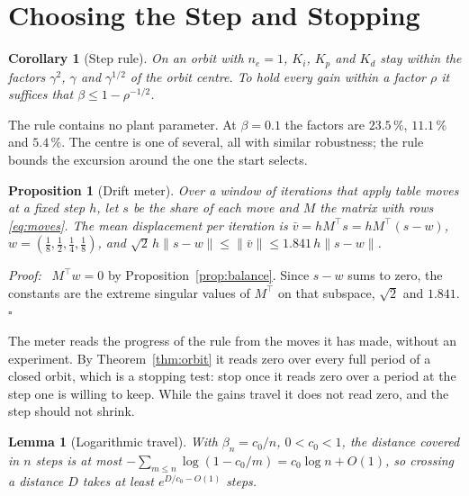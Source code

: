 \documentclass[letterpaper, 10 pt, conference]{ieeeconf}
\newtheorem{lemma}{Lemma}
\newtheorem{proposition}{Proposition}
\newtheorem{corollary}{Corollary}
\renewenvironment{proof}{\noindent\textit{Proof:}\ }{\hfill$\square$\par\smallskip}
\begin{document}
\section{Choosing the Step and Stopping}
\label{sec:step}

\begin{corollary}[Step rule]\label{cor:design}
On an orbit with $n_e = 1$, $K_i$, $K_p$ and $K_d$ stay within the factors
$\gamma^2$, $\gamma$ and $\gamma^{1/2}$ of the orbit centre. To hold every gain
within a factor $\rho$ it suffices that $\beta \le 1 - \rho^{-1/2}$.
\end{corollary}

The rule contains no plant parameter. At $\beta = 0.1$ the factors are
$23.5\,\%$, $11.1\,\%$ and $5.4\,\%$. The centre is one of several, all with
similar robustness; the rule bounds the excursion around the one the start
selects.

\begin{proposition}[Drift meter]\label{prop:meter}
Over a window of iterations that apply table moves at a fixed step $h$, let
$s$ be the share of each move and $M$ the matrix with rows \eqref{eq:moves}.
The mean displacement per iteration is
$\bar v = h M^{\top} s = h M^{\top}(s - w)$,
$w = (\tfrac18, \tfrac12, \tfrac14, \tfrac18)$, and
$\sqrt{2}\, h \lVert s - w \rVert \le \lVert \bar v \rVert \le 1.841\, h
\lVert s - w \rVert$.
\end{proposition}

\begin{proof}
$M^\top w = 0$ by Proposition~\ref{prop:balance}. Since $s - w$ sums to zero,
the constants are the extreme singular values of $M^\top$ on that
subspace, $\sqrt{2}$ and $1.841$.
\end{proof}

The meter reads the progress of the rule from the moves it has made, without
an experiment. By Theorem~\ref{thm:orbit} it reads zero over every full
period of a closed orbit, which is a stopping test: stop once it reads zero
over a period at the step one is willing to keep. While the gains travel it
does not read zero, and the step should not shrink.

\begin{lemma}[Logarithmic travel]\label{lem:travel}
With $\beta_n = c_0/n$, $0 < c_0 < 1$, the distance covered in $n$ steps is
at most $-\sum_{m \le n} \log(1 - c_0/m) = c_0 \log n + O(1)$, so crossing a
distance $D$ takes at least $e^{D/c_0 - O(1)}$ steps.
\end{lemma}
\end{document}
